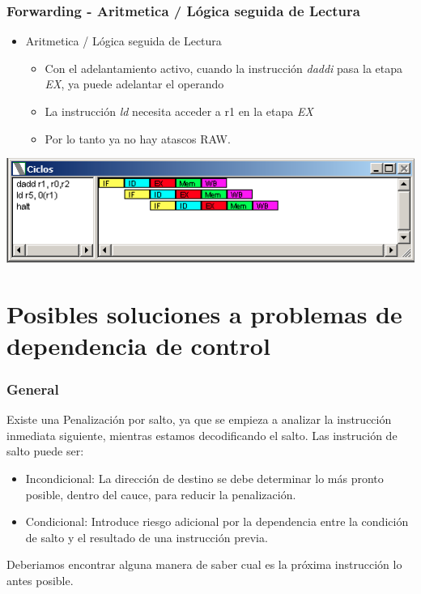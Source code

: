 \documentclass{beamer}
\begin{document}
\begin{frame}[fragile]
\frametitle{Forwarding - Aritmetica / Lógica seguida de Lectura}
\begin{itemize}
\item Aritmetica / Lógica seguida de Lectura
\begin{itemize}
\item Con el adelantamiento activo, cuando la instrucción \emph{daddi} pasa la etapa \emph{EX}, ya puede adelantar el operando
\item La instrucción \emph{ld} necesita acceder a r1 en la etapa \emph{EX}
\item Por lo tanto ya no hay atascos RAW.
\end{itemize}
\end{itemize}
\includegraphics[scale=0.45]{forwarding-8-aritmetica-lectura.png}
\end{frame}


\section{Posibles soluciones a problemas de dependencia de control}
\begin{frame}
\frametitle{General}
Existe una Penalización por salto, ya que se empieza a analizar la instrucción inmediata siguiente, mientras estamos decodificando el salto. Las instrución de salto puede ser: 
\begin{itemize}
\item Incondicional: La dirección de destino se debe determinar lo más pronto posible, dentro del cauce, para reducir la penalización.
\item Condicional: Introduce riesgo adicional por la dependencia entre la condición de salto y el resultado de una instrucción previa.
\end{itemize}
Deberiamos encontrar alguna manera de saber cual es la próxima instrucción lo antes posible.
\end{frame}
\end{document}
